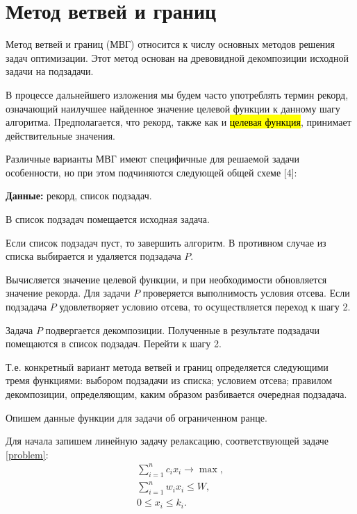 \documentclass[12pt, a4paper]{article}
\begin{document}
	\section{Метод ветвей и границ}
	
	Метод ветвей и границ (МВГ) относится к числу основных методов решения задач оптимизации. Этот метод основан на древовидной декомпозиции исходной задачи на подзадачи.
	
	В процессе дальнейшего изложения мы будем часто употреблять термин рекорд, означающий наилучшее найденное значение целевой функции к данному шагу алгоритма. Предполагается, что рекорд, также как и \hl{целевая функция}, принимает действительные значения.
	
	Различные варианты МВГ имеют специфичные для решаемой задачи особенности, но при этом подчиняются следующей общей схеме [4]:
	
	\textbf{Данные:} рекорд, список подзадач.
	
	\begin{STEP}
		\item В список подзадач помещается исходная задача.
		\item Если список подзадач пуст, то завершить алгоритм. В противном случае из списка выбирается и удаляется подзадача $P$.
		\item Вычисляется значение целевой функции, и при необходимости обновляется значение рекорда. Для задачи $P$ проверяется выполнимость условия отсева. Если подзадача $P$ удовлетворяет условию отсева, то осуществляется переход к шагу 2.
		\item Задача $P$ подвергается декомпозиции. Полученные в результате подзадачи помещаются в список подзадач. Перейти к шагу 2.
	\end{STEP}
	
	Т.е. конкретный вариант метода ветвей и границ определяется следующими тремя функциями: выбором подзадачи из списка; условием отсева; правилом декомпозиции, определяющим, каким образом разбивается очередная подзадача.
	
	Опишем данные функции для задачи об ограниченном ранце.
	
	Для начала запишем линейную задачу релаксацию, соответствующей задаче \eqref{problem}:
	\begin{equation}
		\label{relax_problem}
		\begin{gathered}
			\sum_{i=1}^{n} c_i x_i \rightarrow \max, \\
			\sum_{i=1}^{n} w_i x_i \le W, \\
			0 \le x_i \le k_i.
		\end{gathered}
	\end{equation}
	
\end{document}
